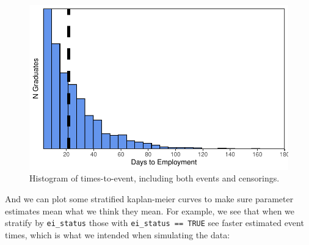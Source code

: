 \documentclass[
  letterpaper,
  DIV=11,
  numbers=noendperiod]{scrreprt}
\begin{document}
\begin{figure}[H]

{\centering \includegraphics{./bayesian-cfa_files/figure-pdf/viz-raw-event-times-1.pdf}

}

\caption{Histogram of times-to-event, including both events and
censorings.}

\end{figure}

And we can plot some stratified kaplan-meier curves to make sure
parameter estimates mean what we think they mean. For example, we see
that when we stratify by \texttt{ei\_status} those with
\texttt{ei\_status\ ==\ TRUE} see faster estimated event times, which is
what we intended when simulating the data:
\end{document}
